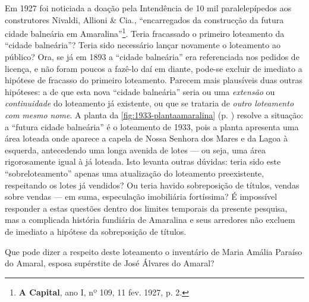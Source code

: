 Em 1927 foi noticiada a doação pela Intendência de 10 mil paralelepípedos aos construtores Nivaldi, Allioni \& Cia., ``encarregados da construcção da futura cidade balneária em Amaralina''\footnote{\textbf{A Capital}, ano I, nº 109, 11 fev. 1927, p. 2.}. Teria fracassado o primeiro loteamento da ``cidade balneária''? Teria sido necessário lançar novamente o loteamento ao público? Ora, se já em 1893 a ``cidade balneária'' era referenciada nos pedidos de licença, e não foram poucos a fazê-lo daí em diante, pode-se excluir de imediato a hipótese de fracasso do primeiro loteamento. Parecem mais plausíveis duas outras hipóteses: a de que esta nova ``cidade balneária'' seria ou uma \textit{extensão} ou \textit{continuidade} do loteamento já existente, ou que se trataria de \textit{outro loteamento com mesmo nome}. A planta da \autoref{fig:1933-plantaamaralina} (p. \pageref{fig:1933-plantaamaralina}) resolve a situação: a ``futura cidade balneária'' é o loteamento de 1933, pois a planta apresenta uma área loteada onde aparece a capela de Nossa Senhora dos Mares e da Lagoa à esquerda, antecedendo uma longa avenida de lotes --- ou seja, uma área rigorosamente igual à já loteada. Isto levanta outras dúvidas: teria sido este ``sobreloteamento'' apenas uma atualização do loteamento preexistente, respeitando os lotes já vendidos? Ou teria havido sobreposição de títulos, vendas sobre vendas --- em suma, especulação imobiliária fortíssima? É impossível responder a estas questões dentro dos limites temporais da presente pesquisa, mas a complicada história fundiária de Amaralina e seus arredores não excluem de imediato a hipótese da sobreposição de títulos.


Que pode dizer a respeito deste loteamento o inventário de Maria Amália Paraíso do Amaral, esposa supérstite de José Álvares do Amaral? 

